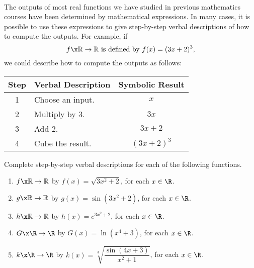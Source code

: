 \pagebreak
\begin{previewactivity} \label{PA:verbaldescriptions} \hfill \\
The outputs of most real functions we have studied in previous mathematics courses have been determined by mathematical expressions.  In many cases, it is possible to use these expressions to give step-by-step verbal descriptions of how to compute the outputs.  For example, if
\[
f\x \mathbb{R} \to \mathbb{R}\text{  is defined by  }f( x ) = ( {3x + 2} )^3, 
\]
we could describe how to compute the outputs as follows:

\begin{center}
\begin{tabular}{| c | l | c|}
\hline
Step  &  \textbf{Verbal Description}  &  \textbf{Symbolic Result}  \\ \hline
1  &  Choose an input.	  &  $x$           \\  \hline
2  &  Multiply by 3.	  &  $3x$          \\  \hline
3  &  Add 2.	        &  $3x + 2$      \\  \hline
4  &  Cube the result.    &  $( {3x + 2} )^3 $  \\  \hline
\end{tabular}
\end{center}
Complete step-by-step verbal descriptions for each of the following functions.
\begin{enumerate}
\item $f\x \mathbb{R} \to \mathbb{R}$ by	$f( x ) = \sqrt {3x^2  + 2} $, for each $x \in \R$.

\item $g\x \mathbb{R} \to \mathbb{R}$ by $g( x ) = \sin \! \left( {3x^2  + 2} \right)$, for each $x \in \R$.

\item $h\x \mathbb{R} \to \mathbb{R}$ by	$h( x ) = e^{3x^2  + 2} $, for each $x \in \R$.
%
\item $G\x  \R \to \R$ by $G(x) = \ln ( x^4 + 3 )$, for each $x \in \R$.
\item $k \x \R \to \R$ by $k(x) = \sqrt[3]{\dfrac{\sin (4x + 3)}{x^2 + 1}}$, for each $x \in \R$.
\end{enumerate}
\end{previewactivity}
\hbreak

\endinput
